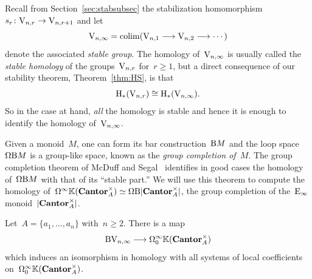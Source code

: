 Recall from Section~\ref{sec:stabsubsec} the stabilization homomorphism~$s_r\colon\mathrm{V}_{n,r}\to \mathrm{V}_{n,r+1}$ and let
\[
\mathrm{V}_{n,\infty}=\operatorname*{colim}(\mathrm{V}_{n,1}\longrightarrow \mathrm{V}_{n,2}\longrightarrow \cdots)
\] 
denote the associated {\em stable group}. The homology of~$\mathrm{V}_{n,\infty}$ is usually called the {\em stable homology} of the groups~$\mathrm{V}_{n,r}$ for~$r\geqslant 1$, but 
a direct consequence of our stability theorem, Theorem~\ref{thm:HS},  is that
\[
\mathrm{H}_*(\mathrm{V}_{n,r})\cong \mathrm{H}_*(\mathrm{V}_{n,\infty}).
\]
So in the case at hand, {\em all} the homology is stable and hence it is enough to identify the homology of~$\mathrm{V}_{n,\infty}$. 

Given a monoid~$M$, one can form its bar construction~$\mathrm{B} M$ and the loop space~$\Omega\mathrm{B} M$ is a group-like space, known as the {\em group completion of~$M$}. The group completion theorem of McDuff and Segal~\cite{McDuff-Segal}  identifies in good cases the  homology of~$\Omega\mathrm{B} M$ with that of its ``stable part.'' We will use this theorem to compute the homology of~$\Omega^\infty\mathbb{K}(\mathbf{Cantor}_A^\times)\simeq \Omega\mathrm{B}|\mathbf{Cantor}_A^\times|$, the group completion of the~$\mathrm{E}_\infty$ monoid~$|\mathbf{Cantor}_A^\times|$. 

\begin{theorem}\label{thm:gpcomp}
Let~$A=\{a_1,\dots,a_n\}$ with~$n\geqslant2$. There is a map 
\[
\mathrm{B}\mathrm{V}_{n,\infty}\longrightarrow\Omega_0^\infty\mathbb{K}(\mathbf{Cantor}_A^\times)
\]
which induces an isomorphism in homology 
with all systems of local coefficients on~$\Omega_0^\infty\mathbb{K}(\mathbf{Cantor}_A^\times)$. 
\end{theorem}


